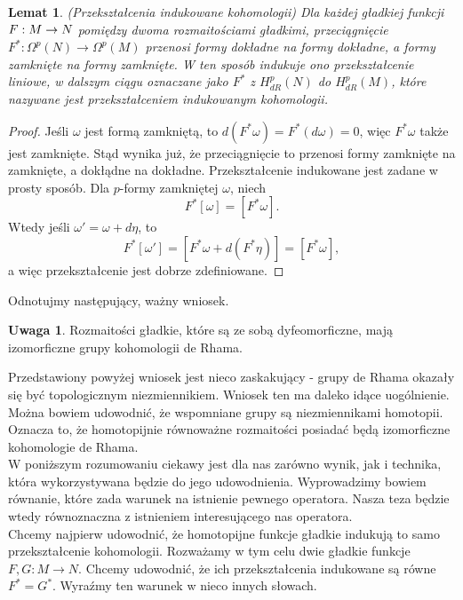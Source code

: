 \documentclass[licencjacka]{pracamgr}
\theoremstyle{definition}
\theoremstyle{definition}
\newtheorem{remark}{Uwaga}[section]
\theoremstyle{plain}
\newtheorem{lemma}{Lemat}[section]
\theoremstyle{plain}
\def\M{\ensuremath M}
\begin{document}
\begin{lemma}(Przekształcenia indukowane kohomologii)
  Dla każdej gładkiej funkcji $F: \M \rightarrow N$ pomiędzy
  dwoma rozmaitościami gładkimi, przeciągnięcie 
  $F^\ast: \Omega^p(N) \rightarrow \Omega^p (M)$ przenosi formy dokładne
  na formy dokładne, a formy zamknięte na formy zamknięte. W ten sposób indukuje
  ono przekształcenie liniowe, w dalszym ciągu oznaczane jako $F^\ast$ z
  $H^p_{dR} (N)$ do $H^p_{dR} (M)$, które nazywane jest przekształceniem indukowanym
  kohomologii. \\
\end{lemma}
\begin{proof}
  Jeśli $\omega$ jest formą zamkniętą, to $d(F^\ast \omega) = F^\ast(d \omega) = 0$,
  więc $F^\ast \omega$ także jest zamknięte. Stąd wynika już, że przeciągnięcie
  to przenosi formy zamknięte na zamknięte, a dokłądne na dokładne. Przekształcenie
  indukowane jest zadane w prosty sposób. Dla $p$-formy zamkniętej $\omega$, niech
  \[
  F^\ast[\omega] = [F^\ast\omega].
  \]
  Wtedy jeśli $\omega' = \omega + d \eta$, to 
  \[
  F^\ast[\omega'] = [F^\ast\omega + d(F^\ast\eta)] = [F^\ast\omega],
  \]
  a więc przekształcenie jest dobrze zdefiniowane.
\end{proof} 
Odnotujmy następujący, ważny wniosek.

\begin{remark}
  Rozmaitości gładkie, które są ze sobą dyfeomorficzne, mają izomorficzne grupy
  kohomologii de Rhama. \\
\end{remark}



Przedstawiony powyżej wniosek jest nieco zaskakujący - grupy de Rhama okazały
się być topologicznym niezmiennikiem. Wniosek ten ma daleko idące uogólnienie.
Można bowiem udowodnić, że wspomniane grupy są niezmiennikami homotopii. Oznacza
to, że homotopijnie równoważne rozmaitości posiadać będą izomorficzne kohomologie
de Rhama. \\

W poniższym rozumowaniu ciekawy jest dla nas zarówno wynik, jak i technika, która
wykorzystywana będzie do jego udowodnienia. Wyprowadzimy bowiem równanie, które
zada warunek na istnienie pewnego operatora. Nasza teza będzie wtedy równoznaczna
z istnieniem interesującego nas operatora. \\

Chcemy najpierw udowodnić, że homotopijne funkcje gładkie indukują to samo 
przekształcenie kohomologii.
Rozważamy w tym celu dwie gładkie funkcje $F, G: M \rightarrow N$.
Chcemy udowodnić, że ich przekształcenia indukowane są równe
$F^\ast = G^\ast$. Wyraźmy ten warunek w nieco innych słowach. \\
\end{document}
